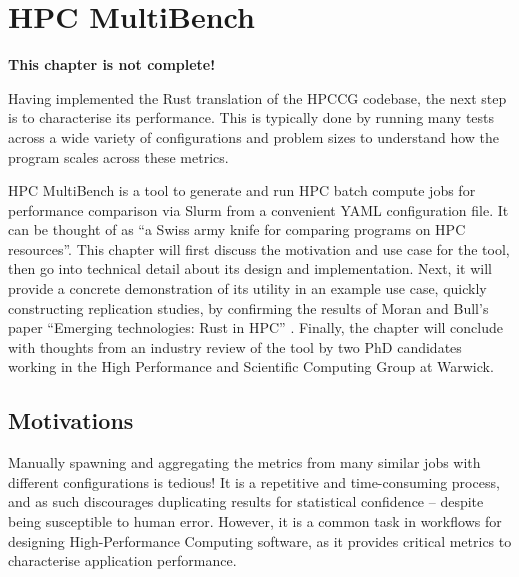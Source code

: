 
\chapter{HPC MultiBench}
\label{ch:hpc-multibench} %

\textbf{This chapter is not complete!}

Having implemented the Rust translation of the HPCCG codebase, the next step is to characterise its performance. This is typically done by running many tests across a wide variety of configurations and problem sizes to understand how the program scales across these metrics.

HPC MultiBench is a tool to generate and run HPC batch compute jobs for performance comparison via Slurm from a convenient YAML configuration file. It can be thought of as ``a Swiss army knife for comparing programs on HPC resources''. This chapter will first discuss the motivation and use case for the tool, then go into technical detail about its design and implementation. Next, it will provide a concrete demonstration of its utility in an example use case, quickly constructing replication studies, by confirming the results of Moran and Bull's paper ``Emerging technologies: Rust in HPC'' \cite{moranEmergingTechnologiesRust2023}. Finally, the chapter will conclude with thoughts from an industry review of the tool by two PhD candidates working in the High Performance and Scientific Computing Group at Warwick.

\section{Motivations}
\label{sec:hpc-multibench-motivation} %

Manually spawning and aggregating the metrics from many similar jobs with different configurations is tedious! It is a repetitive and time-consuming process, and as such discourages duplicating results for statistical confidence -- despite being susceptible to human error. However, it is a common task in workflows for designing High-Performance Computing software, as it provides critical metrics to characterise application performance.

